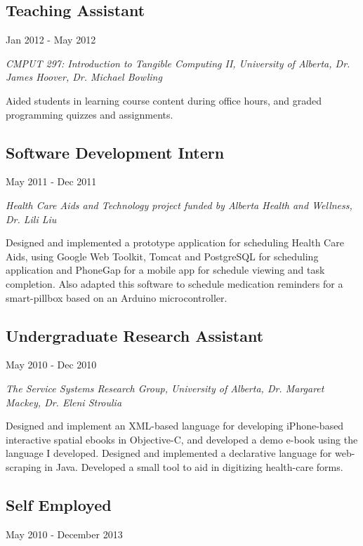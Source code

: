 \documentclass[10pt]{article}
\begin{document}
\subsection*{Teaching Assistant}
Jan 2012 - May 2012

\emph{CMPUT 297: Introduction to Tangible Computing II, University of Alberta, Dr. James Hoover, Dr. Michael Bowling}
\vspace{\baselineskip}

Aided students in learning course content during office hours, and graded programming quizzes and assignments.

\subsection*{Software Development Intern}
May 2011 - Dec 2011

\emph{Health Care Aids and Technology project funded by Alberta Health and Wellness, Dr. Lili Liu}
\vspace{\baselineskip}

Designed and implemented a prototype application for scheduling Health Care Aids, using Google Web Toolkit, Tomcat and PostgreSQL for scheduling application and PhoneGap for a mobile app for schedule viewing and task completion. Also adapted this software to schedule medication reminders for a smart-pillbox based on an Arduino microcontroller.

\subsection*{Undergraduate Research Assistant}
May 2010 - Dec 2010

\emph{The Service Systems Research Group, University of Alberta, Dr. Margaret Mackey, Dr. Eleni Stroulia}
\vspace{\baselineskip}

Designed and implement an XML-based language for developing iPhone-based interactive spatial ebooks in Objective-C, and developed a demo e-book using the language I developed. Designed and implemented a declarative language for web-scraping in Java. Developed a small tool to aid in digitizing health-care forms.



\subsection*{Self Employed}
May 2010 - December 2013
\vspace{\baselineskip}
\end{document}
